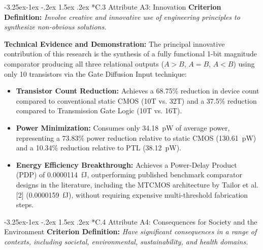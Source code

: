 \documentclass[12pt,a4paper,oneside]{report}
\makeatletter
\renewcommand\subsection{\@startsection{subsection}{2}{\z@}%
                                     {-3.25ex\@plus -1ex \@minus -.2ex}%
                                     {1.5ex \@plus .2ex}%
                                     {\normalfont\normalsize\bfseries\itshape}}
\makeatother
\begin{document}
\subsection*{C.3 Attribute A3: Innovation}
\textbf{Criterion Definition:} \textit{Involve creative and innovative use of engineering principles to synthesize non-obvious solutions.}

\noindent\textbf{Technical Evidence and Demonstration:}
The principal innovative contribution of this research is the synthesis of a fully functional 1-bit magnitude comparator producing all three relational outputs ($A>B$, $A=B$, $A<B$) using only 10 transistors via the Gate Diffusion Input technique:
\begin{itemize}
\item \textbf{Transistor Count Reduction:} Achieves a 68.75\% reduction in device count compared to conventional static CMOS (10T vs. 32T) and a 37.5\% reduction compared to Transmission Gate Logic (10T vs. 16T).
\item \textbf{Power Minimization:} Consumes only 34.18~pW of average power, representing a 73.83\% power reduction relative to static CMOS (130.61~pW) and a 10.34\% reduction relative to PTL (38.12~pW).
\item \textbf{Energy Efficiency Breakthrough:} Achieves a Power-Delay Product (PDP) of 0.0000114~fJ, outperforming published benchmark comparator designs in the literature, including the MTCMOS architecture by Tailor et al. [2] (0.0000159~fJ), without requiring expensive multi-threshold fabrication steps.
\end{itemize}

\subsection*{C.4 Attribute A4: Consequences for Society and the Environment}
\textbf{Criterion Definition:} \textit{Have significant consequences in a range of contexts, including societal, environmental, sustainability, and health domains.}
\end{document}

